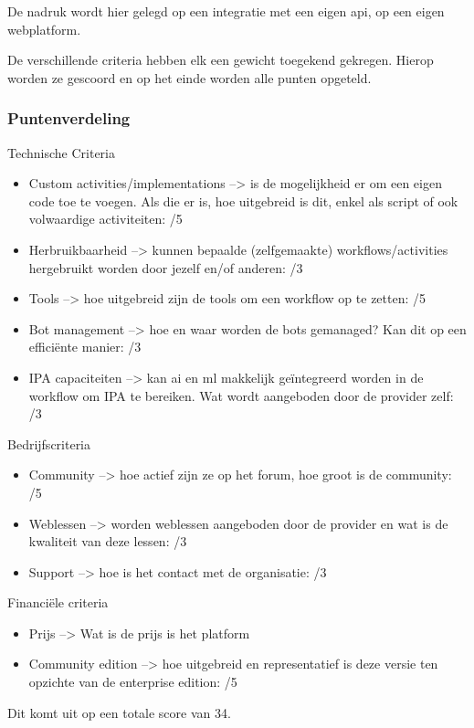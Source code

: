 De nadruk wordt hier gelegd op een integratie met een eigen \acrshort{api}, op een eigen webplatform.

De verschillende criteria hebben elk een gewicht toegekend gekregen. Hierop worden ze gescoord en op het einde worden alle punten opgeteld.

\subsubsection{Puntenverdeling}
Technische Criteria
\begin{itemize}
	\item Custom activities/implementations --> is de mogelijkheid er om een eigen code toe te voegen. Als die er is, hoe uitgebreid is dit, enkel als script of ook volwaardige \gls{activiteit}en: /5
	\item Herbruikbaarheid --> kunnen bepaalde (zelfgemaakte) \gls{workflow}s/activities hergebruikt worden door jezelf en/of anderen: /3
	\item Tools --> hoe uitgebreid zijn de tools om een \gls{workflow} op te zetten: /5
	\item Bot management --> hoe en waar worden de bots gemanaged? Kan dit op een efficiënte manier: /3
	\item IPA capaciteiten --> kan \acrshort{ai} en \acrshort{ml} makkelijk geïntegreerd worden in de \gls{workflow} om IPA te bereiken. Wat wordt aangeboden door de provider zelf: /3
\end{itemize}

Bedrijfscriteria
\begin{itemize}
	\item Community --> hoe actief zijn ze op het forum, hoe groot is de community: /5
	\item Weblessen --> worden weblessen aangeboden door de provider en wat is de kwaliteit van deze lessen: /3
	\item Support --> hoe is het contact met de organisatie: /3
\end{itemize}

Financiële criteria
\begin{itemize}
	\item Prijs --> Wat is de prijs is het platform
	\item Community edition --> hoe uitgebreid en representatief is deze versie ten opzichte van de enterprise edition: /5
\end{itemize}

Dit komt uit op een totale score van 34.

